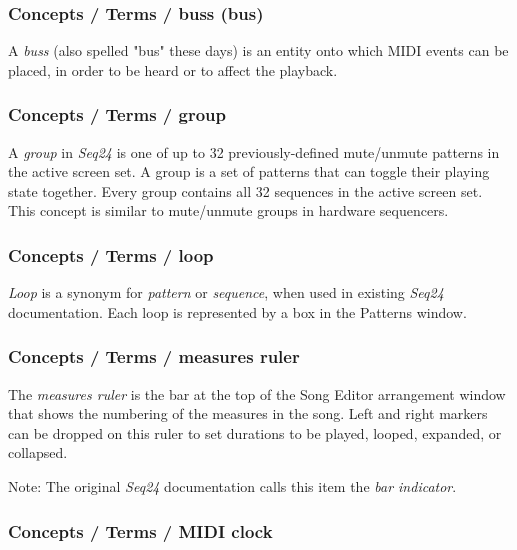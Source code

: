 \subsubsection{Concepts / Terms / buss (bus)}
\label{subsubsec:concepts_terms_buss}

   A \textsl{buss} (also spelled "bus" these days) is an entity onto which
   MIDI events can be placed, in order to be heard or to affect the
   playback.

\subsubsection{Concepts / Terms / group}
\label{subsubsec:concepts_terms_group}

   A \textsl{group} in \textsl{Seq24} is one of up to 32 previously-defined
   mute/unmute patterns in the active screen set.
   A group is a set of patterns that can toggle their playing state
   together.  Every group contains all 32 sequences in the active screen
   set.  This concept is similar to mute/unmute groups in hardware
   sequencers.

\subsubsection{Concepts / Terms / loop}
\label{subsubsec:concepts_terms_loop}

   \textsl{Loop}
   is a synonym for \textsl{pattern} or \textsl{sequence}, when used
   in existing \textsl{Seq24} documentation.
   Each loop is represented by a box in the Patterns window.

\subsubsection{Concepts / Terms / measures ruler}
\label{subsubsec:concepts_terms_measures_ruler}

   The \textsl{measures ruler} is the bar at the top of the Song Editor
   arrangement window that shows the numbering of the measures in the song.
   Left and right markers can be dropped on this ruler to set durations to
   be played, looped, expanded, or collapsed.

   Note:
   The original \textsl{Seq24} documentation calls this item the
   \textsl{bar indicator}.

\subsubsection{Concepts / Terms / MIDI clock}
\label{subsubsec:concepts_terms_midi_clock}

